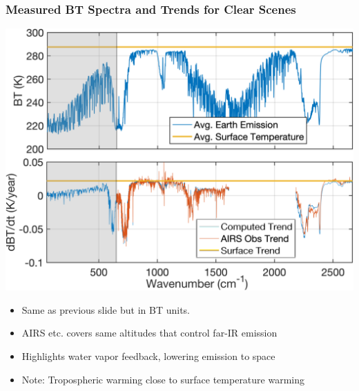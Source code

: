 \documentclass[10pt,t]{beamer}
\begin{document}
\begin{frame}
\frametitle{Measured BT Spectra and Trends for Clear Scenes}  
\vspace{-0.03in}
\centering \includegraphics[width=0.7\linewidth]{Figslls/bt_trends_all_cm.png}
\vspace{-0.05in}
\begin{small}
\begin{itemize}
\item Same as previous slide but in BT units.
\item AIRS etc. covers same altitudes that control far-IR emission
\item Highlights water vapor feedback, lowering emission to space
\item Note: Tropospheric warming close to surface temperature warming  
\end{itemize}
\end{small}
\end{frame}
\end{document}
